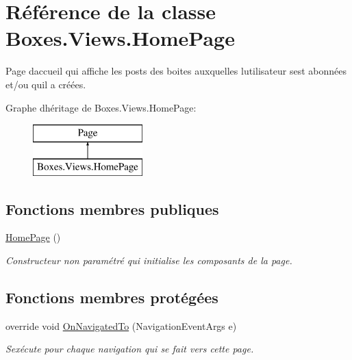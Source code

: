 \hypertarget{class_boxes_1_1_views_1_1_home_page}{}\section{Référence de la classe Boxes.\+Views.\+Home\+Page}
\label{class_boxes_1_1_views_1_1_home_page}


Page d\textquotesingle{}accueil qui affiche les posts des boites auxquelles l\textquotesingle{}utilisateur s\textquotesingle{}est abonnées et/ou qu\textquotesingle{}il a créées.  


Graphe d\textquotesingle{}héritage de Boxes.\+Views.\+Home\+Page\+:\begin{figure}[H]
\begin{center}
\leavevmode
\includegraphics[height=2.000000cm]{class_boxes_1_1_views_1_1_home_page}
\end{center}
\end{figure}
\subsection*{Fonctions membres publiques}
\begin{DoxyCompactItemize}
\item 
\hyperlink{class_boxes_1_1_views_1_1_home_page_ac037b52986f6aaab2cf91e51f7a5a126}{Home\+Page} ()
\begin{DoxyCompactList}\small\item\em Constructeur non paramétré qui initialise les composants de la page. \end{DoxyCompactList}\end{DoxyCompactItemize}
\subsection*{Fonctions membres protégées}
\begin{DoxyCompactItemize}
\item 
override void \hyperlink{class_boxes_1_1_views_1_1_home_page_a6dd589bb72a5c8a9b1ea4522a487d5d5}{On\+Navigated\+To} (Navigation\+Event\+Args e)
\begin{DoxyCompactList}\small\item\em S\textquotesingle{}exécute pour chaque navigation qui se fait vers cette page. \end{DoxyCompactList}\end{DoxyCompactItemize}

